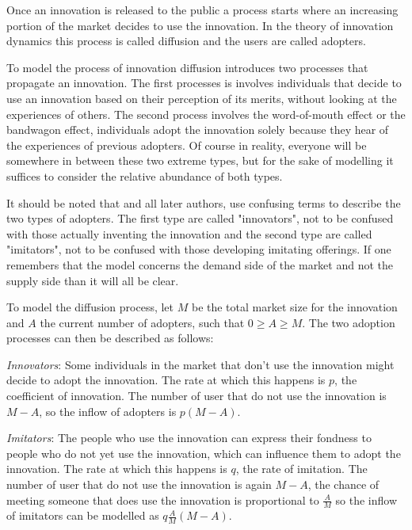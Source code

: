 \documentclass[smallextended,final]{svjour3}
\begin{document}
Once an innovation is released to the public a process starts where an increasing portion of the market decides to use the innovation. In the theory of innovation dynamics this process is called diffusion and the users are called adopters. \citep[see][chapter 4]{narayanan01}

To model the process of innovation diffusion \citet{bass69} introduces two processes that propagate an innovation. The first processes is involves individuals that decide to use an innovation based on their perception of its merits, without looking at the experiences of others. The second process involves the word-of-mouth effect or the bandwagon effect, individuals adopt the innovation solely because they hear of the experiences of previous adopters. Of course in reality, everyone will be somewhere in between these two extreme types, but for the sake of modelling it suffices to consider the relative abundance of both types.

It should be noted that \citet{bass69} and all later authors, use confusing terms to describe the two types of adopters. The first type are called "innovators", not to be confused with those actually inventing the innovation and the second type are called "imitators", not to be confused with those developing imitating offerings. If one remembers that the model concerns the demand side of the market and not the supply side than it will all be clear.

To model the diffusion process, let $M$ be the total market size for the innovation and $A$ the current number of adopters, such that $0 \ge A \ge M$. The two adoption processes can then be described as follows: \citep[see also][]{bass10,mahajan90}

\emph{Innovators}: Some individuals in the market that don't use the innovation might decide to adopt the innovation. The rate at which this happens is $p$, the coefficient of innovation. The number of user that do not use the innovation is $M-A$, so the inflow of adopters is $p(M-A)$.

\emph{Imitators}: The people who use the innovation can express their fondness to people who do not yet use the innovation, which can influence them to adopt the innovation. The rate at which this happens is $q$, the rate of imitation. The number of user that do not use the innovation is again $M-A$, the chance of meeting someone that does use the innovation is proportional to $\frac{A}{M}$ so the inflow of imitators can be modelled as $q\frac{A}{M}(M-A)$.
\end{document}
